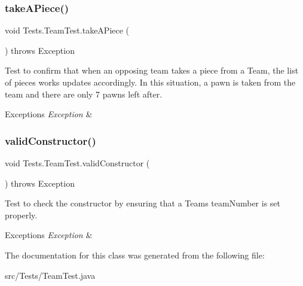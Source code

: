 \subsubsection{\texorpdfstring{take\+A\+Piece()}{takeAPiece()}}
{\footnotesize\ttfamily void Tests.\+Team\+Test.\+take\+A\+Piece (\begin{DoxyParamCaption}{ }\end{DoxyParamCaption}) throws Exception}

Test to confirm that when an opposing team takes a piece from a Team, the list of pieces works updates accordingly. In this situation, a pawn is taken from the team and there are only 7 pawns left after. 
\begin{DoxyExceptions}{Exceptions}
{\em Exception} & \\
\hline
\end{DoxyExceptions}
\hypertarget{class_tests_1_1_team_test_a2e81c6940e0a7ed7ec9f05ea4d0799d7}{}\label{class_tests_1_1_team_test_a2e81c6940e0a7ed7ec9f05ea4d0799d7} 
\subsubsection{\texorpdfstring{valid\+Constructor()}{validConstructor()}}
{\footnotesize\ttfamily void Tests.\+Team\+Test.\+valid\+Constructor (\begin{DoxyParamCaption}{ }\end{DoxyParamCaption}) throws Exception}

Test to check the constructor by ensuring that a Team\textquotesingle{}s team\+Number is set properly. 
\begin{DoxyExceptions}{Exceptions}
{\em Exception} & \\
\hline
\end{DoxyExceptions}


The documentation for this class was generated from the following file\+:\begin{DoxyCompactItemize}
\item 
src/\+Tests/Team\+Test.\+java\end{DoxyCompactItemize}
